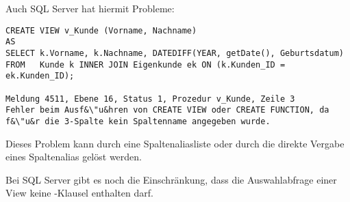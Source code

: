 \clearpage
        Auch SQL Server hat hiermit Probleme:
        \begin{lstlisting}[language=ms_sql,caption={Eine View mit einer berechneten Spalte in SQL Server},label=sql08_34]
CREATE VIEW v_Kunde (Vorname, Nachname)
AS
SELECT k.Vorname, k.Nachname, DATEDIFF(YEAR, getDate(), Geburtsdatum)
FROM   Kunde k INNER JOIN Eigenkunde ek ON (k.Kunden_ID = ek.Kunden_ID);

Meldung 4511, Ebene 16, Status 1, Prozedur v_Kunde, Zeile 3
Fehler beim Ausf&\"u&hren von CREATE VIEW oder CREATE FUNCTION, da
f&\"u&r die 3-Spalte kein Spaltenname angegeben wurde.
        \end{lstlisting}
        Dieses Problem kann durch eine Spaltenaliasliste oder durch die direkte Vergabe eines Spaltenalias gel\"ost werden.
        \begin{merke}
          Bei SQL Server gibt es noch die Einschr\"ankung, dass die Auswahlabfrage einer View keine \ORDERBY-Klausel enthalten darf.
        \end{merke}

